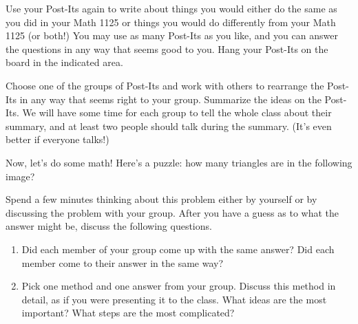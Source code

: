 \documentclass {ximera}
\begin{document}
\begin{question}
Use your Post-Its again to write about things you would either do the same as you did in your Math 1125 or things you would do differently from your Math 1125 (or both!) You may use as many Post-Its as you like, and you can answer the questions in any way that seems good to you. Hang your Post-Its on the board in the indicated area.
\end{question}

\begin{question}
Choose one of the groups of Post-Its and work with others to rearrange the Post-Its in any way that seems right to your group. Summarize the ideas on the Post-Its. We will have some time for each group to tell the whole class about their summary, and at least two people should talk during the summary. (It's even better if everyone talks!)
\end{question}



\newpage


Now, let's do some math! Here's a puzzle: how many triangles are in the following image?

\begin{image}
\end{image}

\begin{problem} 
Spend a few minutes thinking about this problem either by yourself or by discussing the problem with your group.  After you have a guess as to what the answer might be, discuss the following questions.
\begin{enumerate}
\item Did each member of your group come up with the same answer?  Did each member come to their answer in the same way?



\item
Pick one method and one answer from your group.  Discuss this method in detail, as if you were presenting it to the class.  What ideas are the most important?  What steps are the most complicated?

\end{enumerate}
\end{problem}
\end{document}
